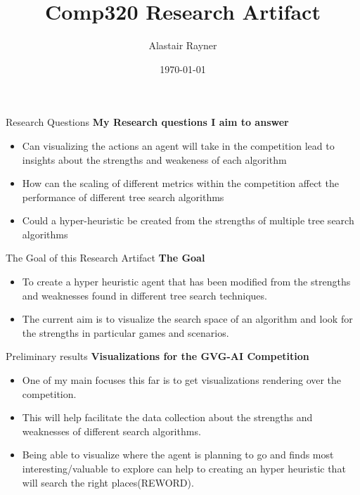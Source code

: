 \documentclass{beamer}
\title{Comp320 Research Artifact}
\author{Alastair Rayner}
\date{\today}
\begin{document}
\maketitle


\begin{frame}{Research Questions}
	\textbf{My Research questions I aim to answer}
	
	
	\begin{itemize}
		\item Can visualizing the actions an agent will take in the competition lead to insights about the strengths and weakeness of each algorithm \pause
		\item How can the scaling of different metrics within the competition affect the performance of different tree search algorithms \pause
		\item Could a hyper-heuristic be created from the strengths of multiple tree search algorithms \pause
	\end{itemize}
\end{frame}



\begin{frame}{The Goal of this Research Artifact}
		\textbf{The Goal} \pause
		\begin{itemize}
			\item To create a hyper heuristic agent that has been modified from the strengths and weaknesses found in different tree search techniques. \pause
			\item The current aim is to visualize the search space of an algorithm and look for the strengths in particular games and scenarios. \pause
		\end{itemize}
\end{frame}


\begin{frame}{Preliminary results}
\textbf{Visualizations for the GVG-AI Competition}
		\begin{itemize}
			\item One of my main focuses this far is to get visualizations rendering over the competition. \pause
			\item This will help facilitate the data collection about the strengths and weaknesses of different search algorithms. \pause
			\item Being able to visualize where the agent is planning to go and finds most interesting/valuable to explore can help to creating an hyper heuristic that will search the right places(REWORD).
		\end{itemize}
\end{frame}
\end{document}
